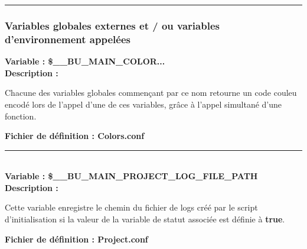 \documentclass[a4paper,10pt]{article}
\begin{document}

    \color{sec3}\par\noindent\rule{\textwidth}{0.4pt}\color{text}

    \color{sec3}
    \subsubsection{Variables globales externes et / ou variables d'environnement appelées}\color{text}

    \textbf{Variable : \color{vars}\$\_\_BU\_MAIN\_COLOR...}\\[1\baselineskip]

    \textbf{Description :}

    \begin{justify}
        Chacune des variables globales commençant par ce nom retourne un code couleu encodé lors de l'appel d'une de ces variables, grâce à l'appel simultané d'une fonction.
    \end{justify}

    \textbf{Fichier de définition : \color{path}Colors.conf}\\[1\baselineskip]




    \color{vars}\par\noindent\rule{\textwidth}{0.4pt}\color{text}\\[1\baselineskip]

    \textbf{Variable : \color{vars}\$\_\_BU\_MAIN\_PROJECT\_LOG\_FILE\_PATH}\\[1\baselineskip]

    \textbf{Description :}

    \begin{justify}
        Cette variable enregistre le chemin du fichier de logs créé par le script d'initialisation si la valeur de la variable de statut associée est définie à \textbf{\color{cmds}true}.
    \end{justify}

    \textbf{Fichier de définition : \color{path}Project.conf} \\[1\baselineskip]



\end{document}
